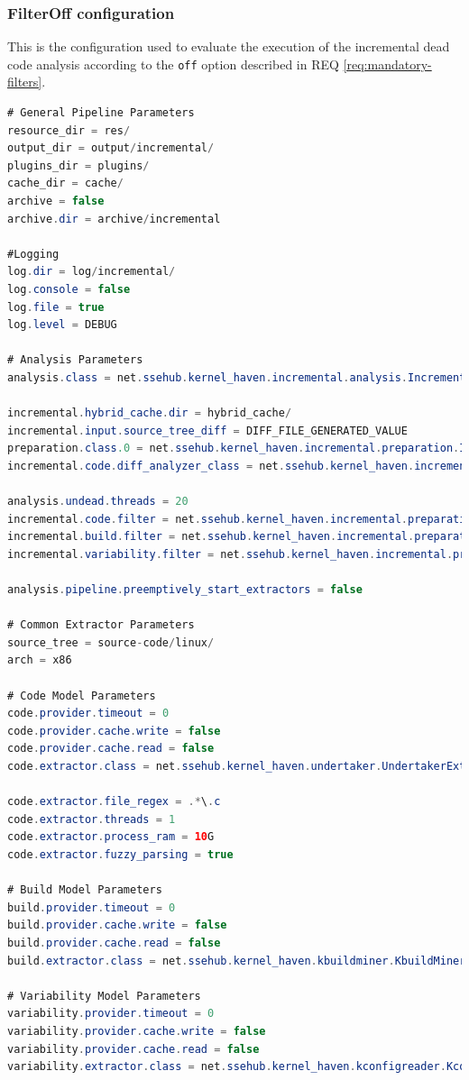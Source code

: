 \documentclass[a4paper]{article}
\begin{document}
\clearpage

\subsubsection{FilterOff configuration}

This is the configuration used to evaluate the execution of the incremental dead code analysis according to the \texttt{off} option described in  REQ \ref{req:mandatory-filters}.

\begin{lstlisting}[language=java]
# General Pipeline Parameters 
resource_dir = res/
output_dir = output/incremental/
plugins_dir = plugins/
cache_dir = cache/
archive = false
archive.dir = archive/incremental

#Logging
log.dir = log/incremental/
log.console = false
log.file = true
log.level = DEBUG

# Analysis Parameters
analysis.class = net.ssehub.kernel_haven.incremental.analysis.IncrementalThreadedDeadCodeAnalysis

incremental.hybrid_cache.dir = hybrid_cache/
incremental.input.source_tree_diff = DIFF_FILE_GENERATED_VALUE
preparation.class.0 = net.ssehub.kernel_haven.incremental.preparation.IncrementalPreparation
incremental.code.diff_analyzer_class = net.ssehub.kernel_haven.incremental.diff.analyzer.SimpleDiffAnalyzer

analysis.undead.threads = 20
incremental.code.filter = net.ssehub.kernel_haven.incremental.preparation.filter.DefaultFilter
incremental.build.filter = net.ssehub.kernel_haven.incremental.preparation.filter.DefaultFilter
incremental.variability.filter = net.ssehub.kernel_haven.incremental.preparation.filter.DefaultFilter

analysis.pipeline.preemptively_start_extractors = false

# Common Extractor Parameters
source_tree = source-code/linux/
arch = x86

# Code Model Parameters
code.provider.timeout = 0
code.provider.cache.write = false
code.provider.cache.read = false
code.extractor.class = net.ssehub.kernel_haven.undertaker.UndertakerExtractor

code.extractor.file_regex = .*\.c
code.extractor.threads = 1
code.extractor.process_ram = 10G
code.extractor.fuzzy_parsing = true

# Build Model Parameters 
build.provider.timeout = 0
build.provider.cache.write = false
build.provider.cache.read = false
build.extractor.class = net.ssehub.kernel_haven.kbuildminer.KbuildMinerExtractor

# Variability Model Parameters
variability.provider.timeout = 0
variability.provider.cache.write = false
variability.provider.cache.read = false
variability.extractor.class = net.ssehub.kernel_haven.kconfigreader.KconfigReaderExtractor
\end{lstlisting}
\end{document}
